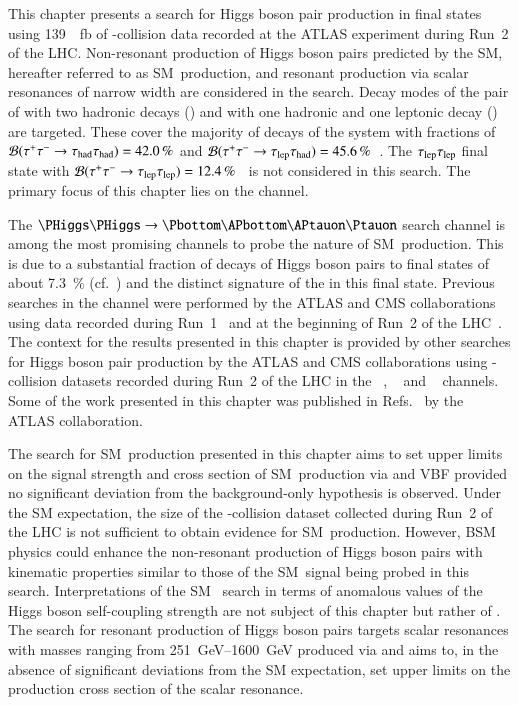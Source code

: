 This chapter presents a search for Higgs boson pair production in \bbtautau
final states using \SI{139}{\per\femto\barn} of \pp-collision data recorded at
the ATLAS experiment during Run~2 of the LHC. Non-resonant production of Higgs
boson pairs predicted by the SM, hereafter referred to as SM~\HH production, and
resonant production via scalar resonances of narrow width are considered in the
search. Decay modes of the pair of \tauleptons with two hadronic \taulepton
decays (\hadhad) and with one hadronic and one leptonic \taulepton decay
(\lephad) are targeted. These cover the majority of decays of the \tautau system
with fractions of $\mathcal{B}(\tau^{+} \tau^{-} \to \tau_{\text{had}}\tau_{\text{had}}) = \SI{42.0}{\percent}$ and
$\mathcal{B}(\tau^{+} \tau^{-} \to \tau_{\text{lep}}\tau_{\text{had}}) =
\SI{45.6}{\percent}$~\cite{Zyla:2020zbs}. The $\tau_{\text{lep}}\tau_{\text{lep}}$ final state with
$\mathcal{B}(\tau^{+} \tau^{-} \to \tau_{\text{lep}}\tau_{\text{lep}}) =
\SI{12.4}{\percent}$~\cite{Zyla:2020zbs} is not considered in this search. The
primary focus of this chapter lies on the \hadhad channel.

The $\HH \to \bbtautau$ search channel is among the most promising channels to
probe the nature of SM~\HH production. This is due to a substantial fraction of
decays of Higgs boson pairs to \bbtautau final states of about
\SI{7.3}{\percent} (cf.~) and the distinct
signature of the \tauleptons in this final state. Previous searches in the
\bbtautau channel were performed by the ATLAS and CMS collaborations using data
recorded during Run~1~\cite{HIGG-2013-33,CMS-HIG-15-013} and at the beginning of
Run~2 of the LHC~\cite{HIGG-2016-16-witherratum,CMS-HIG-17-002}. The context for
the results presented in this chapter is provided by other searches for Higgs
boson pair production by the ATLAS and CMS collaborations using \pp-collision
datasets recorded during Run~2 of the LHC in the
\bbtautau~\cite{CMS-PAS-HIG-20-010},
\bbbb~\cite{ATLAS-CONF-2022-035,CMS-HIG-20-005} and
\bbyy~\cite{HDBS-2018-34,CMS-HIG-19-018} channels. Some of the work presented in
this chapter was published in Refs.~\cite{ATLAS-CONF-2021-030,HDBS-2018-40} by
the ATLAS collaboration.

The search for SM~\HH production presented in this chapter aims to set upper
limits on the signal strength and cross section of SM~\HH production via \ggF
and VBF provided no significant deviation from the background-only hypothesis is
observed. Under the SM expectation, the size of the \pp-collision dataset
collected during Run~2 of the LHC is not sufficient to obtain evidence for
SM~\HH production. However, BSM physics could enhance the non-resonant
production of Higgs boson pairs with kinematic properties similar to those of
the SM~\HH signal being probed in this search. Interpretations of the SM~\HH
search in terms of anomalous values of the Higgs boson self-coupling strength
are not subject of this chapter but rather of
. The search for resonant production of Higgs
boson pairs targets scalar resonances with masses ranging from
\SIrange{251}{1600}{\GeV} produced via \ggF and aims to, in the absence of
significant deviations from the SM expectation, set upper limits on the
production cross section of the scalar resonance.

